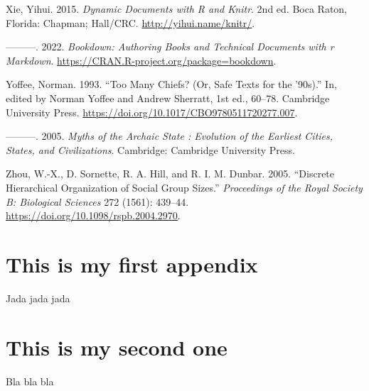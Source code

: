 \documentclass[
  12pt,
]{book}
\newlength{\cslhangindent}
\newlength{\cslentryspacingunit} %
\newenvironment{CSLReferences}[2] %
 {%
  \setlength{\parindent}{0pt}
  \ifodd #1
  \let\oldpar\par
  \def\par{\hangindent=\cslhangindent\oldpar}
  \fi
  \setlength{\parskip}{#2\cslentryspacingunit}
 }%
 {}
\begin{document}
\begin{CSLReferences}{1}{0}
\leavevmode{}%
Xie, Yihui. 2015. \emph{Dynamic Documents with {R} and Knitr}. 2nd ed. Boca Raton, Florida: Chapman; Hall/CRC. \url{http://yihui.name/knitr/}.

\leavevmode{}%
---------. 2022. \emph{Bookdown: Authoring Books and Technical Documents with r Markdown}. \url{https://CRAN.R-project.org/package=bookdown}.

\leavevmode{}%
Yoffee, Norman. 1993. {``Too Many Chiefs? (Or, Safe Texts for the '90s).''} In, edited by Norman Yoffee and Andrew Sherratt, 1st ed., 60--78. Cambridge University Press. \url{https://doi.org/10.1017/CBO9780511720277.007}.

\leavevmode{}%
---------. 2005. \emph{Myths of the Archaic State : Evolution of the Earliest Cities, States, and Civilizations}. Cambridge: Cambridge University Press.

\leavevmode{}%
Zhou, W.-X., D. Sornette, R. A. Hill, and R. I. M. Dunbar. 2005. {``Discrete Hierarchical Organization of Social Group Sizes.''} \emph{Proceedings of the Royal Society B: Biological Sciences} 272 (1561): 439--44. \url{https://doi.org/10.1098/rspb.2004.2970}.

\end{CSLReferences}

\hypertarget{appendix-appendix}{%
\appendix {}}


\hypertarget{this-is-my-first-appendix}{%
\chapter{This is my first appendix}\label{this-is-my-first-appendix}}

Jada jada jada

\hypertarget{this-is-my-second-one}{%
\chapter{This is my second one}\label{this-is-my-second-one}}

Bla bla bla
\end{document}
